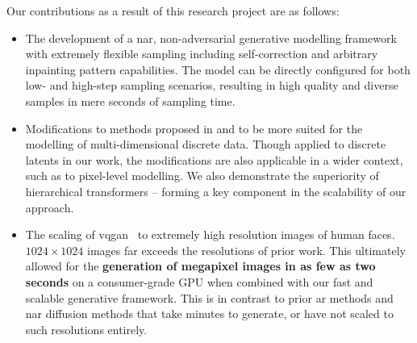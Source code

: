 Our contributions as a result of this research project are as follows:
\begin{itemize}
    \item
        The development of a \acrlong{nar}, non-adversarial generative modelling
        framework with extremely flexible sampling including self-correction and
        arbitrary inpainting pattern capabilities. The model can be directly
        configured for both low- and high-step sampling scenarios, resulting in
        high quality and diverse samples in mere seconds of sampling time.
    \item
        Modifications to methods proposed in \citet{savinov2022stepunrolled} and
        \citet{nawrot2021hierarchical} to be more suited for the modelling of
        multi-dimensional discrete data. Though applied to discrete latents in
        our work, the modifications are also applicable in a wider context,
        such as to pixel-level modelling. We also demonstrate the superiority of
        hierarchical transformers -- forming a key component in the scalability
        of our approach. 
    \item
        The scaling of \gls{vqgan}~\cite{esser2021taming} to extremely high
        resolution images of human faces. $1024 \times 1024$ images far exceeds
        the resolutions of prior work. This ultimately allowed for the
        \textbf{generation of megapixel images in as few as two seconds} on a
        consumer-grade GPU when combined with our fast and scalable generative
        framework. This is in contrast to prior \gls{ar} methods and \gls{nar}
        diffusion methods that take minutes to generate, or have not scaled to
        such resolutions entirely.
\end{itemize}
